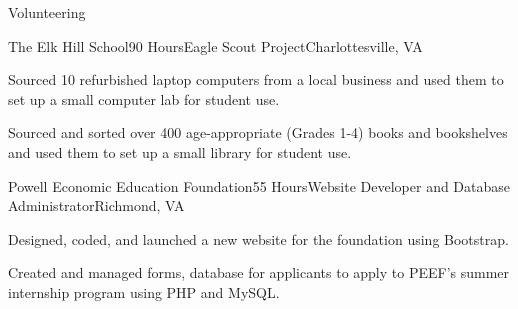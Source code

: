 \documentclass{resume} %
\begin{document}

\begin{rSection}{Volunteering}

\begin{rSubsection}{The Elk Hill School}{90 Hours}{Eagle Scout Project}{Charlottesville, VA}
\item Sourced 10 refurbished laptop computers from a local business and used them
to set up a small computer lab for student use.
\item Sourced and sorted over 400 age-appropriate (Grades 1-4) books and bookshelves and used them to set up a small library for student use.
\end{rSubsection}

\begin{rSubsection}{Powell Economic Education Foundation}{55 Hours}{Website Developer and Database Administrator}{Richmond, VA}
\item Designed, coded, and launched a new  website for the foundation using Bootstrap.
\item Created and managed forms, database for applicants to apply to PEEF's summer internship program using PHP and MySQL.
\end{rSubsection}

\end{rSection}







\end{document}
